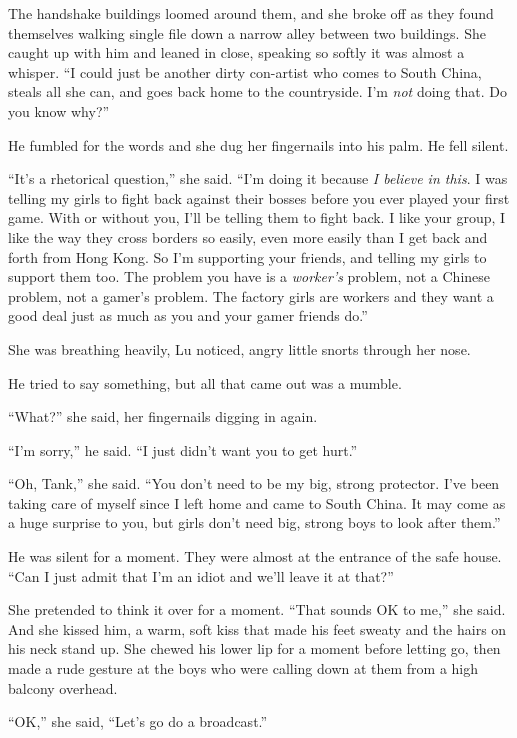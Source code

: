 The handshake buildings loomed around them, and she broke off as
they found themselves walking single file down a narrow alley
between two buildings. She caught up with him and leaned in close,
speaking so softly it was almost a whisper. ``I could just be
another dirty con-artist who comes to South China, steals all she
can, and goes back home to the countryside. I'm \emph{not} doing
that. Do you know why?''

He fumbled for the words and she dug her fingernails into his palm.
He fell silent.

``It's a rhetorical question,'' she said. ``I'm doing it because
\emph{I believe in this}. I was telling my girls to fight back
against their bosses before you ever played your first game. With
or without you, I'll be telling them to fight back. I like your
group, I like the way they cross borders so easily, even more
easily than I get back and forth from Hong Kong. So I'm supporting
your friends, and telling my girls to support them too. The problem
you have is a \emph{worker's} problem, not a Chinese problem, not a
gamer's problem. The factory girls are workers and they want a good
deal just as much as you and your gamer friends do.''

She was breathing heavily, Lu noticed, angry little snorts through
her nose.

He tried to say something, but all that came out was a mumble.

``What?'' she said, her fingernails digging in again.

``I'm sorry,'' he said. ``I just didn't want you to get hurt.''

``Oh, Tank,'' she said. ``You don't need to be my big, strong
protector. I've been taking care of myself since I left home and
came to South China. It may come as a huge surprise to you, but
girls don't need big, strong boys to look after them.''

He was silent for a moment. They were almost at the entrance of the
safe house. ``Can I just admit that I'm an idiot and we'll leave it
at that?''

She pretended to think it over for a moment. ``That sounds OK to
me,'' she said. And she kissed him, a warm, soft kiss that made his
feet sweaty and the hairs on his neck stand up. She chewed his
lower lip for a moment before letting go, then made a rude gesture
at the boys who were calling down at them from a high balcony
overhead.

``OK,'' she said, ``Let's go do a broadcast.''

